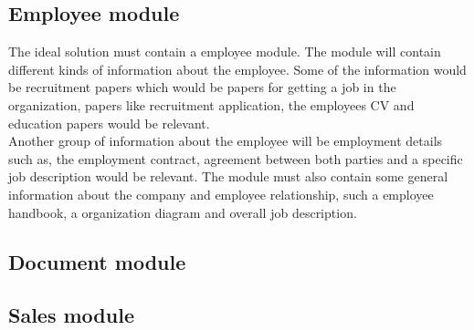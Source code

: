 \subsection{Employee module}
The ideal solution must contain a employee module. The module will contain different kinds of information about the employee. Some of the information would be recruitment papers which would be papers for getting a job in the organization, papers like recruitment application, the employees CV and education papers would be relevant. \\
Another group of information about the employee will be employment details such as, the employment contract, agreement between both parties and a specific job description would be relevant. The module must also contain some general information about the company and employee relationship, such a employee handbook, a organization diagram and overall job description.

\subsection{Document module}

\subsection{Sales module}